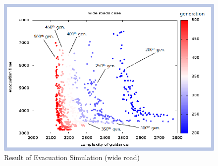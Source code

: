 \begin{figure}
  \centering
  \includegraphics[width=.8\linewidth]{Figs.noda/figure-11.evac_wide.eps}
  \caption{Result of Evacuation Simulation (wide road)}
  \label{fig:Figs.noda/figure-11.evac_wide.eps}
\end{figure}

